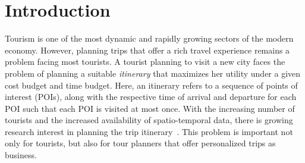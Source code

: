 \documentclass[sigconf,authordraft]{acmart}
\begin{document}





\maketitle

\section{Introduction}
Tourism is one of the most dynamic and rapidly growing sectors of the modern economy. However, planning trips that offer a rich travel experience remains a problem facing most tourists. A tourist planning to visit a new city faces the problem of planning a suitable \emph{itinerary} that maximizes her utility under a given cost budget and time budget. Here, an itinerary refers to a sequence of points of interest (POIs), along with the respective time of arrival and departure for each POI such that each POI is visited at most once. With the increasing number of tourists and the increased availability of spatio-temporal data, there is growing research interest in planning the trip itinerary~\cite{li2016travel, gavalas2014survey, sylejmani2011survey}. This problem is important not only for tourists, but also for tour planners that offer personalized trips as business.
\end{document}
